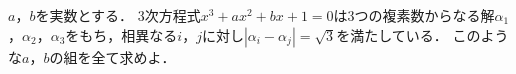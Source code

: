 \documentclass[../../main.tex]{subfiles}
\begin{document}
$a$，$b$を実数とする．
3次方程式$x^3+ax^2+bx+1=0$は3つの複素数からなる解$\alpha_1$，$\alpha_2$，$\alpha_3$をもち，相異なる$i$，$j$に対し$|\alpha_i-\alpha_j|=\sqrt{3}$を満たしている．
このような$a$，$b$の組を全て求めよ．
\end{document}
